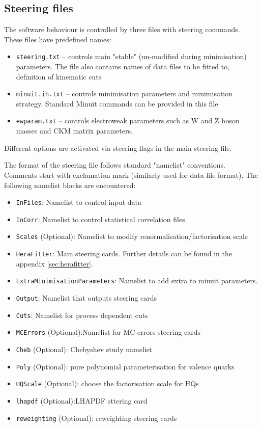 \label{sec:man}
\subsection{Steering files}
    The software behaviour is controlled by three files with steering commands.
    These files have predefined names:
    \begin{itemize}
      \item {\tt steering.txt}  --   controls main "stable" (un-modified during 
                         minimisation) parameters. The file also contains
                         names of data files to be fitted to, definition 
                         of kinematic cuts                              
      \item {\tt minuit.in.txt}
                   --  controls minimisation parameters and minimisation 
                         strategy. Standard Minuit commands can be provided
                         in this file
      \item {\tt ewparam.txt}    --  controls electroweak parameters such
         as W and Z boson masses and CKM matrix parameters.
    \end{itemize}

Different options are activated via steering flags in the main steering file.


 
   The format of the steering file follows standard "namelist" conventions.
 Comments start with exclamation mark (similarly used for data file format).
The following namelist blocks are encountered:
\begin{itemize}
\item  {\tt InFiles}: Namelist to control input data
\item  {\tt InCorr}: Namelist to control statistical correlation files
\item  {\tt Scales} (Optional): Namelist to modify renormalisation/factorisation scale
\item  {\tt HeraFitter}: Main steering cards. Further details can be found in the appendix \ref{sec:herafitter}. 
\item  {\tt ExtraMinimisationParameters}:  Namelist to add extra to minuit parameters.
\item  {\tt Output}: Namelist that outputs steering cards 
\item  {\tt Cuts}: Namelist for process dependent cuts
\item  {\tt MCErrors} (Optional):Namelist for MC errors steering cards
\item  {\tt Cheb} (Optional): Chebyshev study namelist
\item  {\tt Poly} (Optional): pure polynomial parameterisation for valence quarks
\item  {\tt HQScale} (Optional): choose the factorisation scale for HQs
\item  {\tt lhapdf} (Optional):LHAPDF sttering card
\item  {\tt reweighting} (Optional): reweighting steering cards
\end{itemize}

